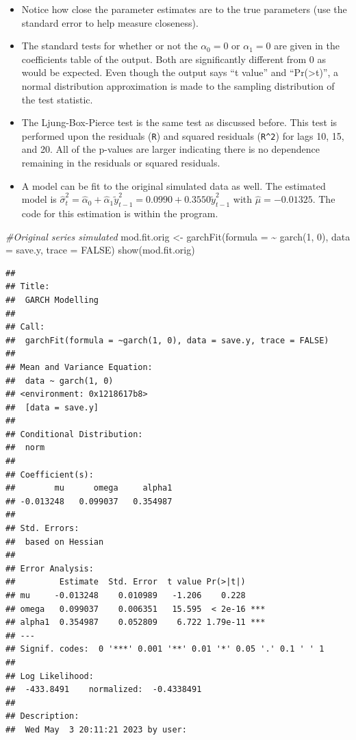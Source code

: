 \documentclass[
]{book}
\newenvironment{Shaded}{\begin{snugshade}}{\end{snugshade}}
\newcommand{\AttributeTok}[1]{\textcolor[rgb]{0.77,0.63,0.00}{#1}}
\newcommand{\CommentTok}[1]{\textcolor[rgb]{0.56,0.35,0.01}{\textit{#1}}}
\newcommand{\ConstantTok}[1]{\textcolor[rgb]{0.00,0.00,0.00}{#1}}
\newcommand{\DecValTok}[1]{\textcolor[rgb]{0.00,0.00,0.81}{#1}}
\newcommand{\FunctionTok}[1]{\textcolor[rgb]{0.00,0.00,0.00}{#1}}
\newcommand{\NormalTok}[1]{#1}
\newcommand{\OtherTok}[1]{\textcolor[rgb]{0.56,0.35,0.01}{#1}}
\newcommand{\SpecialCharTok}[1]{\textcolor[rgb]{0.00,0.00,0.00}{#1}}
\theoremstyle{definition}
\theoremstyle{definition}
\theoremstyle{definition}
\theoremstyle{definition}
\theoremstyle{remark}
\begin{document}
\begin{itemize}
\item
  Notice how close the parameter estimates are to the true parameters (use the standard error to help measure closeness).\\
\item
  The standard tests for whether or not the \(\alpha_0 = 0\) or \(\alpha_1 = 0\) are given in the coefficients table of the output. Both are significantly different from 0 as would be expected. Even though the output says ``t value'' and ``Pr(\textgreater\textbar t\textbar)'', a normal distribution approximation is made to the sampling distribution of the test statistic.
\item
  The Ljung-Box-Pierce test is the same test as discussed before. This test is performed upon the residuals (\texttt{R}) and squared residuals (\texttt{R\^{}2}) for lags 10, 15, and 20. All of the p-values are larger indicating there is no dependence remaining in the residuals or squared residuals.
\item
  A model can be fit to the original simulated data as well. The estimated model is \(\hat \sigma_t^2=\hat \alpha_0+\hat \alpha_1\tilde y^2_{t-1}=0.0990+0.3550\tilde y^2_{t-1}\) with \(\hat \mu = -0.01325\). The code for this estimation is within the program.
\end{itemize}

\begin{Shaded}
\begin{Highlighting}[]
\CommentTok{\#Original series simulated}
\NormalTok{  mod.fit.orig }\OtherTok{\textless{}{-}} \FunctionTok{garchFit}\NormalTok{(}\AttributeTok{formula =} \SpecialCharTok{\textasciitilde{}} \FunctionTok{garch}\NormalTok{(}\DecValTok{1}\NormalTok{, }\DecValTok{0}\NormalTok{), }\AttributeTok{data =}\NormalTok{ save.y, }\AttributeTok{trace =} \ConstantTok{FALSE}\NormalTok{)}
  \FunctionTok{show}\NormalTok{(mod.fit.orig)}
\end{Highlighting}
\end{Shaded}

\begin{verbatim}
## 
## Title:
##  GARCH Modelling 
## 
## Call:
##  garchFit(formula = ~garch(1, 0), data = save.y, trace = FALSE) 
## 
## Mean and Variance Equation:
##  data ~ garch(1, 0)
## <environment: 0x1218617b8>
##  [data = save.y]
## 
## Conditional Distribution:
##  norm 
## 
## Coefficient(s):
##        mu      omega     alpha1  
## -0.013248   0.099037   0.354987  
## 
## Std. Errors:
##  based on Hessian 
## 
## Error Analysis:
##         Estimate  Std. Error  t value Pr(>|t|)    
## mu     -0.013248    0.010989   -1.206    0.228    
## omega   0.099037    0.006351   15.595  < 2e-16 ***
## alpha1  0.354987    0.052809    6.722 1.79e-11 ***
## ---
## Signif. codes:  0 '***' 0.001 '**' 0.01 '*' 0.05 '.' 0.1 ' ' 1
## 
## Log Likelihood:
##  -433.8491    normalized:  -0.4338491 
## 
## Description:
##  Wed May  3 20:11:21 2023 by user:
\end{verbatim}
\end{document}
